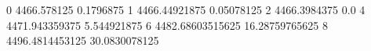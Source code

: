 0 4466.578125 0.1796875
1 4466.44921875 0.05078125
2 4466.3984375 0.0
4 4471.943359375 5.544921875
6 4482.68603515625 16.28759765625
8 4496.4814453125 30.0830078125
